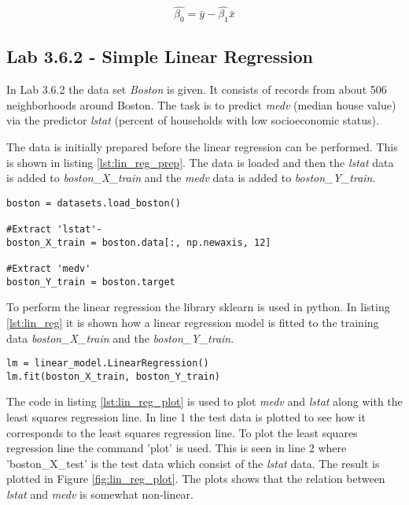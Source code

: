 \begin{equation}
\hat{\beta_0} = \bar{y} -\hat{\beta_1}\bar{x}
\end{equation}



\subsection{Lab 3.6.2 - Simple Linear Regression}

In Lab 3.6.2 the data set \emph{Boston} is given. It consists of records from about 506 neighborhoods around Boston. The task is to predict \emph{medv} (median house value) via the predictor \emph{lstat} (percent of households with low socioeconomic status).

The data is initially prepared before the linear regression can be performed. This is shown in listing \ref{lst:lin_reg_prep}. The data is loaded and then the \emph{lstat} data is added to \emph{boston\_X\_train} and the \emph{medv} data is added to \emph{boston\_Y\_train}.

\begin{lstlisting}[caption={Data preparation for linear regression}, label=lst:lin_reg_prep, mathescape=true]
boston = datasets.load_boston()

#Extract 'lstat'-
boston_X_train = boston.data[:, np.newaxis, 12]

#Extract 'medv'
boston_Y_train = boston.target
\end{lstlisting}

To perform the linear regression the library sklearn is used in python. In listing \ref{lst:lin_reg} it is shown how a linear regression model is fitted to the training data \emph{boston\_X\_train} and the \emph{boston\_Y\_train}.

\begin{lstlisting}[caption={Python linear regression function}, label=lst:lin_reg, mathescape=true]
lm = linear_model.LinearRegression()
lm.fit(boston_X_train, boston_Y_train)
\end{lstlisting}

\FloatBarrier

The code in listing \ref{lst:lin_reg_plot} is used to plot \emph{medv} and \emph{lstat} along with the least squares regression line. In line 1 the test data is plotted to see how it corresponds to the least squares regression line. To plot the least squares regression line the command 'plot' is used. This is seen in line 2 where 'boston\_X\_test' is the test data which consist of the \emph{lstat} data. The result is plotted in Figure \ref{fig:lin_reg_plot}. The plots shows that the relation between \emph{lstat} and \emph{medv} is somewhat non-linear. 

